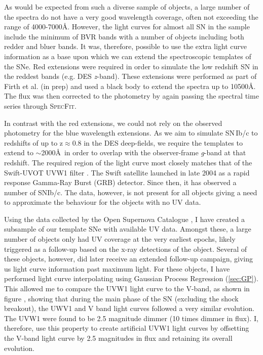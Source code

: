 As would be expected from such a diverse sample of objects, a large number of the spectra do not have a very good wavelength coverage, often not exceeding the range of 4000-7000\AA. However, the light curves for almost all SN in the sample include the minimum of BVR bands with a number of objects including both redder and bluer bands. It was, therefore, possible to use the extra light curve information as a base upon which we can extend the spectroscopic templates of the SNe. Red extensions were required in order to simulate the low redshift SN in the reddest bands (e.g. DES \textit{z}-band). These extensions were performed as part of Firth et al. (in prep) and used a black body to extend the spectra up to 10500\AA. The flux was then corrected to the photometry by again passing the spectral time series through \textsc{SpecFit}.

In contrast with the red extensions, we could not rely on the observed photometry for the blue wavelength extensions. As we aim to simulate SN\,Ib/c to redshifts of up to z$\approx$0.8 in the DES deep-fields, we require the templates to extend to $\sim$2000\AA~in order to overlap with the observer-frame \textit{g}-band at that redshift. The required region of the light curve most closely matches that of the Swift-UVOT UVW1 filter \citep{Roming2005}. The Swift satellite launched in late 2004 as a rapid response Gamma-Ray Burst (GRB) detector. Since then, it has observed a number of SNIb/c. The data, however, is not present for all objects giving a need to approximate the behaviour for the objects with no UV data.

Using the data collected by the Open Supernova Catalogue \citep[OSC;][]{Guillochon2017}, I have created a subsample of our template SNe with available UV data. Amongst these, a large number of objects only had UV coverage at the very earliest epochs, likely triggered as a follow-up based on the x-ray detections of the object. Several of these objects, however, did later receive an extended follow-up campaign, giving us light curve information past maximum light. For these objects, I have performed light curve interpolating using Gaussian Process Regression (\cref{sec:GP}). This allowed me to compare the UVW1 light curve to the V-band, as shown in figure , showing that during the main phase of the SN (excluding the shock breakout), the UWV1 and V band light curves followed a very similar evolution. The UVW1 were found to be 2.5 magnitude dimmer (10 times dimmer in flux). I, therefore, use this property to create artificial UVW1 light curves by offsetting the V-band light curve by 2.5 magnitudes in flux and retaining its overall evolution.

